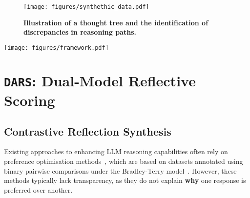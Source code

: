 \begin{figure}[ht]
\centering
\texttt{[image: figures/synthethic\_data.pdf]} 
\vspace{-2mm}
\caption{\small \textbf{Illustration of a thought tree and the identification of discrepancies in reasoning paths.}}
\vspace{-3mm}
\label{fig:thoughtTree}
\end{figure}

\begin{figure*}[t]
\centering
\texttt{[image: figures/framework.pdf]}
\vspace{-6mm}
\caption{\textbf{(Left)}: Example conversation between the trained Reasoner and Critic. \textbf{(Right)}: Illustration of our \texttt{DARS} framework. A detailed explanation of this example is provided within training details in \textsection{\ref{sec:training}}. The context related to the Reasoner's initial mistake is highlighted in \textcolor{blue}{blue}, while the refinement is marked in \textcolor{red}{red}. Some question context is omitted in \textcircled{\raisebox{-0.3pt} {\scriptsize1}}, but the full example can be found in \textsection{\ref{sec:figure_full_example}}. Here, \textcircled{\raisebox{-0.3pt} {\scriptsize1}} represents the framework’s input, while the final response from the Reasoner before the Critic’s termination (\textcircled{\raisebox{-0.3pt} {\scriptsize4}}) serves as the framework’s output.}
\label{fig:framework}
\vspace{-4mm}
\end{figure*}



\section{\texttt{DARS}: Dual-Model Reflective Scoring} %
\subsection{Contrastive Reflection Synthesis}\label{sec:method_data_curation}



Existing approaches to enhancing LLM reasoning capabilities often rely on preference optimisation methods~\cite{Lu2024StepControlledDL, step_value_emnlp2024}, which are based on datasets annotated using binary pairwise comparisons under the Bradley-Terry model~\cite{bt}. However, these methods typically lack transparency, as they do not explain \textbf{why} one response is preferred over another.

